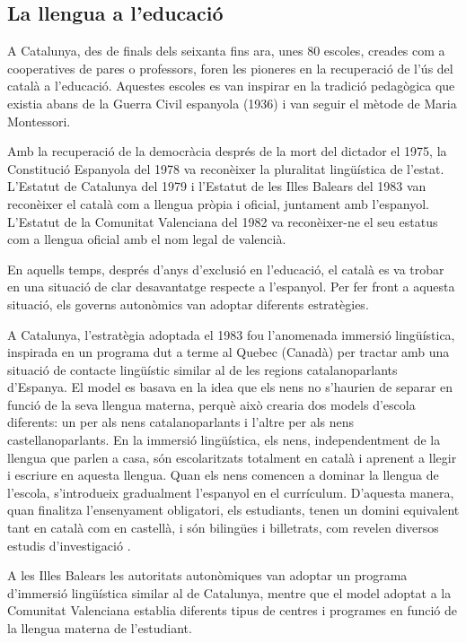 \begin{multicols}{2}
\subsection{La llengua a l’educació}

A Catalunya, des de finals dels seixanta fins ara, unes 80 escoles, creades com a cooperatives de pares o professors, foren les pioneres en la recuperació de l’ús del català a l’educació. Aquestes escoles es van inspirar en la tradició pedagògica que existia abans de la Guerra Civil espanyola (1936) i van seguir el mètode de Maria Montessori.

Amb la recuperació de la democràcia després de la mort del dictador el 1975, la Constitució Espanyola del 1978 va reconèixer la pluralitat lingüística de l’estat. L’Estatut de Catalunya del 1979 i l’Estatut de les Illes Balears del 1983 van reconèixer el català com a llengua pròpia i oficial, juntament amb l’espanyol. L’Estatut de la Comunitat Valenciana del 1982 va reconèixer-ne el seu estatus com a llengua oficial amb el nom legal de valencià.

En aquells temps, després d’anys d’ex\-clu\-sió en l’educació, el català es va trobar en una situació de clar desavantatge respecte a l’espanyol. Per fer front a aquesta situació, els governs autonòmics van adoptar diferents estratègies.

A Catalunya, l’estratègia adoptada el 1983 fou l’anomenada immersió lingüística, inspirada en un programa dut a terme al Quebec (Canadà) per tractar amb una situació de contacte lingüístic similar al de les regions catalanoparlants d’Espanya. El model es basava en la idea que els nens no s’haurien de separar en funció de la seva llengua materna, perquè això crearia dos models d’escola diferents: un per als nens catalanoparlants i l’altre per als nens castellanoparlants. En la immersió lingüística, els nens, independentment de la llengua que parlen a casa, són escolaritzats totalment en català i aprenent a llegir i escriure en aquesta llengua. Quan els nens comencen a dominar la llengua de l’escola, s’introdueix gradualment l’espanyol en el currículum. D’aquesta manera, quan finalitza l’ensenyament obligatori, els estudiants, tenen un domini equivalent tant en català com en castellà, i són bilingües i billetrats, com revelen diversos estudis d’investigació \cite{CAT-Nota5}.

A les Illes Balears les autoritats autonòmiques van adoptar un programa d’immersió lingüística similar al de Catalunya, mentre que el model adoptat a la Comunitat Valenciana establia diferents tipus de centres i programes en funció de la llengua materna de l’estudiant.


\end{multicols}
